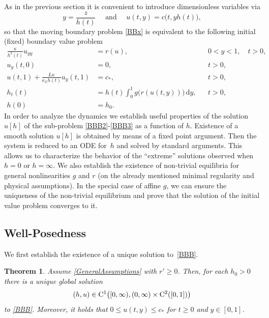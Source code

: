 \documentclass[reqno,11pt]{amsart}
\newtheorem{thm}{Theorem}[section]
\numberwithin{equation}{section}
\newcommand{\rd}{\mathrm{d}}
\begin{document}
As in the previous section it is convenient to introduce dimensionless
variables via
$$
y=\frac{z}{h(t)}\quad \text{ and }\quad u(t,y)=c\bigl(t,yh(t)\bigr),
$$
so that the moving boundary problem \eqref{BBx} is equivalent to the
following initial (fixed) boundary value problem
\begin{subequations}
\label{BBB}
\begin{align}
\frac{\kappa}{h^2(t)} u_{yy}&= r(u),  &&0<y<1,\quad t>0,\label{BBB2}\\
u_y(t,0)&=0, &&t>0,\label{BBB4}\\
u(t,1)+\frac{L\kappa}{\kappa_L h(t)} u_y(t,1)&=c_*, &&t>0,\label{BBB3}\\
h_t(t)&=h(t)\int_0^1 g\big(r(u(t,y))\big)\,\rd y,&& t>0,\label{BBB6}\\
h(0)&=h_0.\label{BBB7}
\end{align}
\end{subequations}
In order to analyze the dynamics we establish useful properties of the solution $u[h]$ of the sub-problem
\eqref{BBB2}-\eqref{BBB3}  as a function of $h$. Existence of a smooth solution
$u[h]$ is obtained by means of a fixed point argument. Then the system
is reduced to an ODE for~$h$ and solved by standard arguments. This
allows us to characterize the behavior of the ``extreme'' solutions
observed when $h=0$ or $h=\infty$. We also establish the
existence of non-trivial equilibria for general nonlinearities $g$ and
$r$ (on the already mentioned minimal regularity and physical
assumptions). In the special case of affine $g$, we can ensure the
uniqueness of the non-trivial equilibrium and prove that the solution
of the initial value problem converges to it. 




\subsection{Well-Posedness}

We first establish the existence of a unique solution to~\eqref{BBB}.

 


\begin{thm}\label{T1}
Assume \eqref{GeneralAssumptions} with $r'\ge 0$. Then, for each $h_0>0$ there is a
unique global solution
$$
(h,u)\in {\rm C}^1\big([0,\infty),(0,\infty)\times
{\rm C}^2([0,1])\big)
$$
to \eqref{BBB}. Moreover, it holds that $0\le u(t,y)\le c_*$ for $t\ge
0$ and $y\in[0,1]$.
\end{thm}
\end{document}
